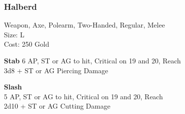 \subsubsection{Halberd}\label{weapon:halberd}
Weapon, Axe, Polearm, Two-Handed, Regular, Melee\\
Size: L\\
Cost: 250 Gold

\textbf{Stab}
6 AP, ST or AG to hit, Critical on 19 and 20,  Reach\\
3d8 + \texttimes ST or AG Piercing Damage

\textbf{Slash}\\
5 AP, ST or AG to hit, Critical on 19 and 20,  Reach\\
2d10 + \texttimes ST or AG Cutting Damage

